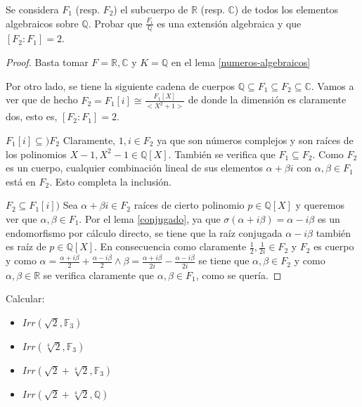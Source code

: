 \begin{exercise}
Se considera $F_1$ (resp. $F_2$) el subcuerpo de $\mathbb{R}$ (resp. $\mathbb{C}$) de todos los elementos algebraicos sobre $\mathbb{Q}$. Probar que $\frac{F_i}{\mathbb{Q}}$ es una extensión algebraica y que $[F_2:F_1] = 2$. 
\end{exercise}
\begin{proof}
Basta tomar $F = \mathbb{R},\mathbb{C}$ y $K = \mathbb{Q}$ en el lema \ref{numeros-algebraicos}

Por otro lado, se tiene la siguiente cadena de cuerpos $\mathbb{Q} \subseteq F_1 \subseteq F_2 \subseteq \mathbb{C}$. Vamos a ver que de hecho $F_2 = F_1[i] \cong \frac{F_1[X]}{<X^2+1>}$ de donde la dimensión es claramente dos, esto es, $[F_2:F_1] = 2$. 

$F_1[i] \subseteq) F_2$ Claramente, $1,i \in F_2$ ya que son números complejos y son raíces de los polinomios $X-1,X^2-1 \in \mathbb{Q}[X]$. También se verifica que $F_1 \subseteq F_2$. Como $F_2$ es un cuerpo, cualquier combinación lineal de sus elementos $\alpha + \beta i$ con $\alpha,\beta \in F_1$ está en $F_2$. Esto completa la inclusión. 

$F_2 \subseteq F_1[i])$ Sea $\alpha + \beta i \in F_2$ raíces de cierto polinomio $p \in \mathbb{Q}[X]$ y queremos ver que $\alpha,\beta \in F_1$. Por el lema \ref{conjugado}, ya que $\sigma(\alpha + i\beta ) = \alpha - i \beta$ es un endomorfismo por cálculo directo, se tiene que la raíz conjugada $\alpha - i \beta$ también es raíz de $p \in \mathbb{Q}[X]$.  En consecuencia como claramente $\frac{1}{2}, \frac{1}{2i} \in F_2$ y $F_2$ es cuerpo y como $\alpha = \frac{\alpha + i \beta}{2} + \frac{\alpha -i \beta}{2} \land \beta = \frac{\alpha + i\beta}{2i} - \frac{\alpha - i\beta}{2i}$ se tiene que $\alpha,\beta \in F_2$ y como $\alpha,\beta \in \mathbb{R}$ se verifica claramente que $\alpha,\beta \in F_1$, como se quería.  
\end{proof}

\pagebreak

\begin{exercise}
Calcular:

\begin{itemize}
\item $Irr(\sqrt{2},\mathbb{F}_3)$
\item $Irr(\sqrt[4]{2},\mathbb{F}_3)$
\item $Irr(\sqrt{2}+\sqrt[4]{2},\mathbb{F}_3)$
\item $Irr(\sqrt{2}+\sqrt[4]{2},\mathbb{Q})$
\end{itemize}
\end{exercise}

